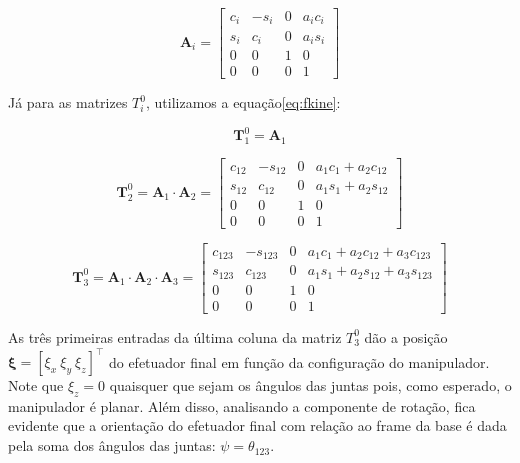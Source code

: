 \begin{equation}
    \bm{A}_i = \begin{bmatrix}
        c_i & -s_i & 0 & a_i c_i \\
        s_i & c_i  & 0 & a_i s_i \\
        0   & 0    & 1 & 0       \\
        0   & 0    & 0 & 1
    \end{bmatrix}
\end{equation}

Já para as matrizes \(T^0_i\), utilizamos a equação\ref{eq:fkine}:

\begin{equation}
    \bm{T}^0_1 = \bm{A}_1
\end{equation}

\begin{equation}
    \bm{T}^0_2 = \bm{A}_1 \cdot \bm{A}_2 = \begin{bmatrix}
        c_{12} & -s_{12} & 0 & a_1c_1 + a_2c_{12} \\
        s_{12} & c_{12}  & 0 & a_1s_1 + a_2s_{12} \\
        0      & 0       & 1 & 0                  \\
        0      & 0       & 0 & 1
    \end{bmatrix}
\end{equation}

\begin{equation}
    \bm{T}^0_3 = \bm{A}_1 \cdot \bm{A}_2 \cdot \bm{A}_3 = \begin{bmatrix}
        c_{123} & -s_{123} & 0 & a_1c_1 + a_2c_{12} + a_3c_{123} \\
        s_{123} & c_{123}  & 0 & a_1s_1 + a_2s_{12} + a_3s_{123} \\
        0       & 0        & 1 & 0                               \\
        0       & 0        & 0 & 1
    \end{bmatrix}
\end{equation}

As três primeiras entradas da última coluna da matriz \(T^0_3\) dão a posição
\(\bm{\xi} = {\left[ \xi_x \ \xi_y \ \xi_z \right]}^{\top}\) do efetuador final em função
da configuração do manipulador. Note que $\xi_z = 0$ quaisquer que sejam os
ângulos das juntas pois, como esperado, o manipulador é planar. Além disso,
analisando a componente de rotação, fica evidente que a orientação do efetuador
final com relação ao frame da base é dada pela soma dos ângulos das juntas:
$\psi = \theta_{123}$.

